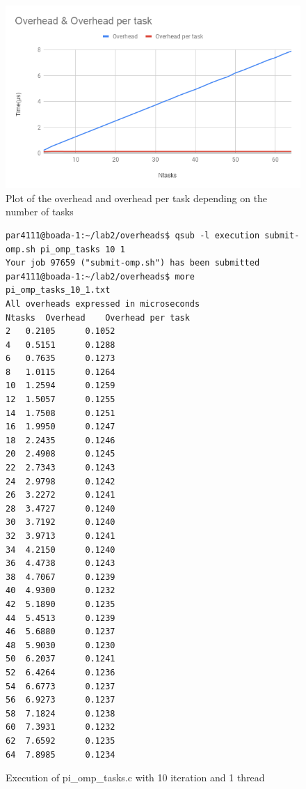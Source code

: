 \documentclass[12]{article}
\begin{document}
\begin{figure}[H]
\centering
\includegraphics[scale=0.5]{images/task.png}
\caption{Plot of the overhead and overhead per task depending on the number of tasks}
\label{overheadplot2}
\end{figure}


\begin{figure}[H]
\begin{lstlisting}[frame=single]
par4111@boada-1:~/lab2/overheads$ qsub -l execution submit-omp.sh pi_omp_tasks 10 1
Your job 97659 ("submit-omp.sh") has been submitted
par4111@boada-1:~/lab2/overheads$ more pi_omp_tasks_10_1.txt 
All overheads expressed in microseconds
Ntasks	Overhead	Overhead per task
2	0.2105		0.1052
4	0.5151		0.1288
6	0.7635		0.1273
8	1.0115		0.1264
10	1.2594		0.1259
12	1.5057		0.1255
14	1.7508		0.1251
16	1.9950		0.1247
18	2.2435		0.1246
20	2.4908		0.1245
22	2.7343		0.1243
24	2.9798		0.1242
26	3.2272		0.1241
28	3.4727		0.1240
30	3.7192		0.1240
32	3.9713		0.1241
34	4.2150		0.1240
36	4.4738		0.1243
38	4.7067		0.1239
40	4.9300		0.1232
42	5.1890		0.1235
44	5.4513		0.1239
46	5.6880		0.1237
48	5.9030		0.1230
50	6.2037		0.1241
52	6.4264		0.1236
54	6.6773		0.1237
56	6.9273		0.1237
58	7.1824		0.1238
60	7.3931		0.1232
62	7.6592		0.1235
64	7.8985		0.1234
\end{lstlisting}
\caption{Execution of pi\_omp\_tasks.c with 10 iteration and 1 thread}
\label{piqueuetask}
\end{figure}
\end{document}
